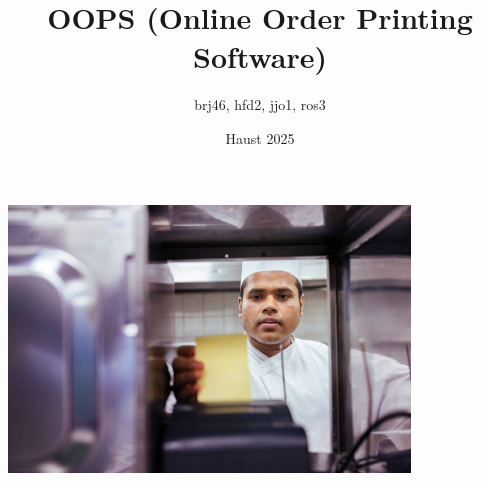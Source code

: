 \documentclass{article}
\title{OOPS (Online Order Printing Software)}
\author{brj46, hfd2, jjo1, ros3}
\date{Haust 2025}
\begin{document}
\maketitle

\vspace{5em}
\begin{center}
    \includegraphics[width=0.8\textwidth]{imgs/order-in-kitchen.jpg}
\end{center}

\newpage
\end{document}

